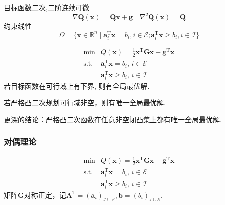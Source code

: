 目标函数二次,二阶连续可微
\[
    \nabla \boldsymbol{Q}(\boldsymbol{x})=\boldsymbol{Qx}+\boldsymbol{g}\quad\nabla^{2}\boldsymbol{Q}(\boldsymbol{x})=\boldsymbol{Q}
\]
约束线性
\[
    \Omega=\{\boldsymbol{x}\in \mathbb{R}^{n}\mid\boldsymbol{a}_{i}^{\mathrm{T}}\boldsymbol{x}=b_{i},i\in\mathcal{E};\boldsymbol{a}_{i}^{\mathrm{T}}\boldsymbol{x}\geqslant b_{i},i\in\mathcal{I}\}
\]
\begin{theorem}
    \[
        \begin{array}{rl}
            \operatorname*{min} & Q(\boldsymbol{x})=\frac{1}{2}\boldsymbol{x}^{\mathrm{T}}\boldsymbol{G}\boldsymbol{x}+\boldsymbol{g}^{\mathrm{T}}\boldsymbol{x}\\
            \mathrm{s.t.} & \boldsymbol{a}_{i}^{\mathrm{T}}\boldsymbol{x}=b_{i},\,i\in\mathcal{E}\\
            & \boldsymbol{a}_{i}^{\mathrm{T}}\boldsymbol{x}\geqslant b_{i},\,i\in\mathcal{I}
        \end{array}
    \]
    若目标函数在可行域上有下界, 则有全局最优解.
\end{theorem}
\begin{corollary}
    若\textcolor{red!75}{严格凸二次规划}可行域非空，则有唯一全局最优解.
\end{corollary}
\begin{corollary}
    更深的结论：严格凸二次函数在任意\textcolor{red!75}{非空闭凸集}上都有唯一全局最优解.
\end{corollary}
\subsubsection{对偶理论}
\[
    \begin{array}{rl}
        \operatorname*{min} & Q(\boldsymbol{x})=\frac{1}{2}\boldsymbol{x}^{\mathrm{T}}\boldsymbol{G}\boldsymbol{x}+\boldsymbol{g}^{\mathrm{T}}\boldsymbol{x}\\
        \mathrm{s.t.} & \boldsymbol{a}_{i}^{\mathrm{T}}\boldsymbol{x}=b_{i},\,i\in\mathcal{E}\\
         & \boldsymbol{a}_{i}^{\mathrm{T}}\boldsymbol{x}\geqslant b_{i},\,i\in\mathcal{I}
    \end{array}
\]
矩阵$\boldsymbol{G}$对称正定，记$\boldsymbol{A}^{\mathrm{T}}=(\boldsymbol{a}_{i})_{\mathcal{I}\cup\mathcal{E}},\boldsymbol{b}=(b_{i})_{\mathcal{I}\cup\mathcal{E}}.$

